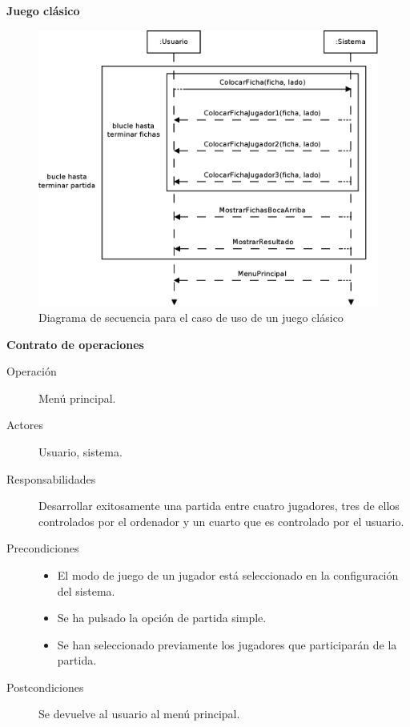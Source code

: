 \textbf{Juego clásico}
\begin{figure}[h]
  \begin{center}
    \includegraphics[scale=0.25]{diagrama_clases_juego_clasico.png}
  \end{center}
  \caption{Diagrama de secuencia para el caso de uso de un juego clásico}
  \label{diagrama_clases_juego_clasico}
\end{figure}

\textbf{Contrato de operaciones}
\begin{description}
    \item[Operación] Menú principal.
    \item[Actores] Usuario, sistema.
    \item[Responsabilidades] Desarrollar exitosamente una partida entre cuatro jugadores, tres de ellos controlados por el
            ordenador y un cuarto que es controlado por el usuario.
    \item[Precondiciones]
        \begin{itemize}
            \item El modo de juego de un jugador está seleccionado en la configuración del sistema.
            \item Se ha pulsado la opción de partida simple.
            \item Se han seleccionado previamente los jugadores que participarán de la partida.
        \end{itemize}
    \item[Postcondiciones] Se devuelve al usuario al menú principal.
\end{description}

